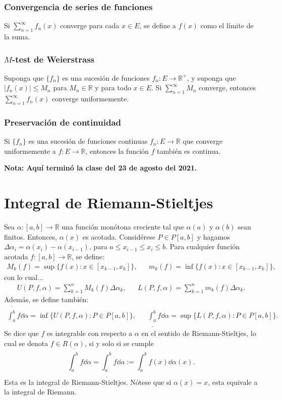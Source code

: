 \documentclass{article}
\begin{document}
\subsubsection*{Convergencia de series de funciones}

Si $\displaystyle\sum_{n=1}^{\infty} f_n(x)$ converge para cada $x\in E$, se define a $f(x)$ como el límite de la suma.

\subsubsection*{$M$-test de Weierstrass}

Suponga que $\{f_n\}$ es una sucesión de funciones $f_n: E\to\mathbb{R}^+$, y suponga que $|f_n(x)|\leq M_n$ para $M_n\in\mathbb{R}$ y para todo $x\in E$. Si $\displaystyle\sum_{n=1}^\infty M_n$ converge, entonces $\displaystyle\sum_{n=1}^{\infty}f_n(x)$ converge uniformemente. 

\subsubsection*{Preservación de continuidad}

Si $\{f_n\}$ es una sucesión de funciones continuas $f_n: E\to\mathbb{R}$ que converge uniformemente a $f: E\to\mathbb{R}$, entonces la función $f$ también es continua.

\vspace{10pt}
\textbf{Nota: Aquí terminó la clase del 23 de agosto del 2021.}

\section*{Integral de Riemann-Stieltjes}

Sea $\alpha:[a,b]\to\mathbb{R}$ una función monótona creciente tal que $\alpha(a)$ y $\alpha(b)$ sean finitos. Entonces, $\alpha(x)$ es acotada. Considérese $P\in P[a,b]$ y hagamos $\Delta \alpha_i=\alpha(x_i)-\alpha(x_{i-1})$, para $a\leq x_{i-1}\leq x_i\leq b$. Para cualquier función acotada $f:[a,b]\to\mathbb{R}$, se define:
\begin{align*}
M_k(f)=\sup\{f(x): x\in[x_{k-1},x_k]\}, && m_k(f)=\inf\{f(x): x\in[x_{k-1},x_k]\},
\end{align*}
con lo cual...
\begin{align*}
U(P,f,\alpha)=\sum_{k=1}^{n}M_k(f)\Delta \alpha_{k}, && L(P,f,\alpha)=\sum_{k=1}^{n}m_k(f)\Delta \alpha_{k}.
\end{align*}
Además, se define también:
\begin{align*}
\overline{\int_{a}^{b}}f\dd{\alpha}=\inf\big\{U(P,f,\alpha): P\in P[a,b]\big\}, && \underline{\int_{a}^{b}}f\dd{\alpha}=\sup\big\{L(P,f,\alpha): P\in P[a,b]\big\}.
\end{align*}
Se dice que $f$ es integrable con respecto a $\alpha$ en el sentido de Riemann-Stieltjes, lo cual se denota $f\in R(\alpha)$, si y solo si se cumple
$$\overline{\int_{a}^{b}}f\dd{\alpha}=\underline{\int_{a}^{b}}f\dd{\alpha}:=\int_{a}^{b}f(x)\dd{\alpha(x)}.$$
Esta es la integral de Riemann-Stieltjes. Nótese que si $\alpha(x)=x$, esta equivale a la integral de Riemann.
\end{document}
